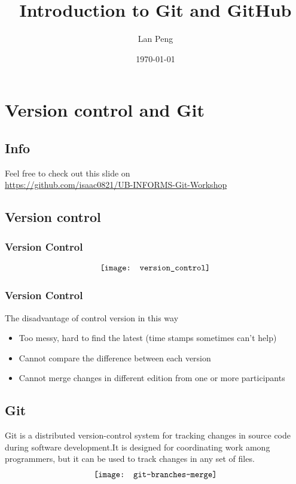 \documentclass{beamer}
\title{Introduction to Git and GitHub}
\author{Lan Peng}
\institute{Department of Industrial and Systems Engineering, University at Buffalo, SUNY}
\date{\today}
\begin{document}
	\frame{\titlepage}
	

	\section{Version control and Git}
		\subsection{Info}
			\begin{frame}
				Feel free to check out this slide on\\
				\url{https://github.com/isaac0821/UB-INFORMS-Git-Workshop}				
			\end{frame}
		\subsection{Version control}
			\begin{frame}
				\frametitle{Version Control}
				\begin{align}
					\centering
					\texttt{[image: version\_control]} \nonumber
				\end{align}			
			\end{frame}

			\begin{frame}
				\frametitle{Version Control}
				The disadvantage of control version in this way
				\begin{itemize}
					\item Too messy, hard to find the latest (time stamps sometimes can't help)
					\item Cannot compare the difference between each version
					\item Cannot merge changes in different edition from one or more participants
				\end{itemize}
			\end{frame}
		\subsection{Git}
			\begin{frame}
				Git is a distributed version-control system for tracking changes in source code during software development.It is designed for coordinating work among programmers, but it can be used to track changes in any set of files.
				\begin{align}
					\centering
					\texttt{[image: git-branches-merge]} \nonumber
				\end{align}
			\end{frame}
\end{document}
